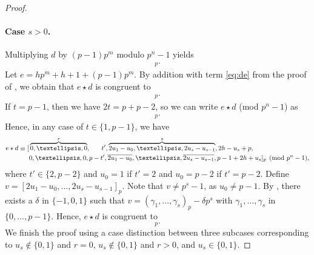 \documentclass[10pt,a4paper]{amsart}
\newcommand{\comp}[1]{\bar{#1}}
\begin{document}
\begin{proof}
\paragraph{Case $s>0$.} 
Multiplying $d$ by $(p-1)p^m$ modulo $p^n - 1$ yields
\begin{align*}
[&\overbrace{0,\dots,0}^r,t,u_1-t,\overbrace{u_2-u_1,u_3-u_2,\dots,u_s-u_{s-1}}^{s-1},p-1-u_s,\\
&\overbrace{0,\dots,0}^r,-t,-(u_1-t),\overbrace{-(u_2-u_1),-(u_3-u_2),\dots,-(u_s-u_{s-1})}^{s-1},p-1+u_s]_p.    
\end{align*}
Let $e = hp^m + h+1 + (p-1)p^m$. By addition with term \eqref{eq:de} from the proof of , we obtain that $e \star d$ is congruent to
\begin{align*}
    [&\overbrace{0,\dots,0}^r,\phantom{p-}\;\,2t,2u_1-t,\overbrace{2u_2-u_1,\ldots,2u_s-u_{s-1}}^{s-1}, 2h-u_s+p,\\ &\,0,\dots,0,p-2t, \overline{2u_1-t},\overline{2u_2-u_1},\dots,\overline{2u_s-u_{s-1}},p-1+2h+u_s]_p.
\end{align*}
If $t = p-1$, then we have $2t = p + p-2$, so we can write $e \star d$ (mod $p^n-1$) as
\begin{align*}
    [&\overbrace{0,\dots,0}^r,\hphantom{p-()}p-2,2u_1-(p-2),\overbrace{2u_2-u_1,\dots,2u_s-u_{s-1}}^{s-1}, 2h-u_s+p,\\ &\,0,\dots,0,\,p-(p-2), \overline{2u_1-(p-2)},\overline{2u_2-u_1},\dots,\overline{2u_s-u_{s-1}},p-1+2h+u_s]_p.
\end{align*}
Hence, in any case of $t \in \{1,p-1\}$, we have
\begin{align*}
e \star d \equiv [&\overbrace{0,\dots,0}^r,\hphantom{p-}\;\,t',\overbrace{2u_1-u_0,\ldots,2u_s-u_{s-1}}^{s}, 2h-u_s+p,\\ &0,\dots,0,p-t', \overline{2u_1-u_0},\ldots,\overline{2u_s-u_{s-1}},p-1+2h+u_s]_p \pmod {p^n-1},
\end{align*}
where $t' \in \{2,p-2\}$ and $u_0 = 1$ if $t' = 2$ and $u_0 = p - 2$ if $t' = p - 2$. Define $v = [2u_1-u_0,\dots,2u_s - u_{s-1}]_p$. Note that $v \neq p^s-1$, as $u_0 \neq p-1$.
By , there exists a $\delta$ in $\{-1, 0, 1\}$ such that $v = (\gamma_1, \ldots, \gamma_s)_p - \delta p^s$ with $\gamma_1, \ldots, \gamma_s$ in $\{0,\dots,p-1\}$. Hence, $e \star d$ is congruent to
\begin{equation*}
[\overbrace{0,\dots,0}^r,t',\overbrace{\gamma_1,\dots,\gamma_s}^s, 2h-u_s+p-\delta, \overbrace{0,\dots,0}^r,p-t', \overbrace{\comp{\gamma}_1,\dots,\comp{\gamma}_s}^s,p-1+2h+u_s+\delta]_p.
\end{equation*}
We finish the proof using a case distinction between three subcases corresponding to $u_s \notin \{0, 1\}$ and $r = 0$, $u_s \notin \{0, 1\}$ and $r > 0$, and $u_s \in \{0, 1\}$.


\end{proof}
\end{document}
